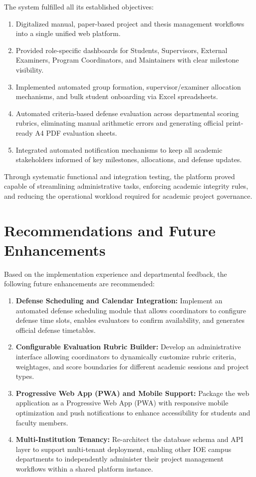 \documentclass[12pt,a4paper]{report}
\begin{document}
The system fulfilled all its established objectives:
\begin{enumerate}
  \item Digitalized manual, paper-based project and thesis management workflows into a single unified web platform.
  \item Provided role-specific dashboards for Students, Supervisors, External Examiners, Program Coordinators, and Maintainers with clear milestone visibility.
  \item Implemented automated group formation, supervisor/examiner allocation mechanisms, and bulk student onboarding via Excel spreadsheets.
  \item Automated criteria-based defense evaluation across departmental scoring rubrics, eliminating manual arithmetic errors and generating official print-ready A4 PDF evaluation sheets.
  \item Integrated automated notification mechanisms to keep all academic stakeholders informed of key milestones, allocations, and defense updates.
\end{enumerate}

Through systematic functional and integration testing, the platform proved capable of streamlining administrative tasks, enforcing academic integrity rules, and reducing the operational workload required for academic project governance.

\section{Recommendations and Future Enhancements}
Based on the implementation experience and departmental feedback, the following future enhancements are recommended:

\begin{enumerate}
  \item \textbf{Defense Scheduling and Calendar Integration:} Implement an automated defense scheduling module that allows coordinators to configure defense time slots, enables evaluators to confirm availability, and generates official defense timetables.
  
  \item \textbf{Configurable Evaluation Rubric Builder:} Develop an administrative interface allowing coordinators to dynamically customize rubric criteria, weightages, and score boundaries for different academic sessions and project types.
  
  \item \textbf{Progressive Web App (PWA) and Mobile Support:} Package the web application as a Progressive Web App (PWA) with responsive mobile optimization and push notifications to enhance accessibility for students and faculty members.
  
  \item \textbf{Multi-Institution Tenancy:} Re-architect the database schema and API layer to support multi-tenant deployment, enabling other IOE campus departments to independently administer their project management workflows within a shared platform instance.
\end{enumerate}
\end{document}
